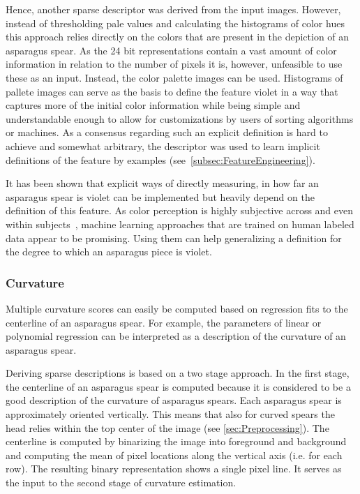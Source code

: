 Hence, another sparse descriptor was derived from the input images. However, instead of thresholding pale values and calculating the histograms of color hues this approach relies directly on the colors that are present in the depiction of an asparagus spear. As the 24 bit representations contain a vast amount of color information in relation to the number of pixels it is, however, unfeasible to use these as an input. Instead, the color palette images can be used. Histograms of pallete images can serve as the basis to define the feature violet in a way that captures more of the initial color information while being simple and understandable enough to allow for customizations by users of sorting algorithms or machines. As a consensus regarding such an explicit definition is hard to achieve and somewhat arbitrary, the descriptor was used to learn implicit definitions of the feature by examples (see~\autoref{subsec:FeatureEngineering}).

\bigskip
It has been shown that explicit ways of directly measuring, in how far an asparagus spear is violet can be implemented but heavily depend on the definition of this feature. As color perception is highly subjective across and even within subjects~\citep{reeves1981metacontrast}, machine learning approaches that are trained on human labeled data appear to be promising. Using them can help generalizing a definition for the degree to which an asparagus piece is violet.


\subsubsection{Curvature}
\label{subsec:Curvature}

Multiple curvature scores can easily be computed based on regression fits to the centerline of an asparagus spear. For example, the parameters of linear or polynomial regression can be interpreted as a description of the curvature of an asparagus spear. 

Deriving sparse descriptions is based on a two stage approach. In the first stage, the centerline of an asparagus spear is computed because it is considered to be a good description of the curvature of asparagus spears. Each asparagus spear is approximately oriented vertically. This means that also for curved spears the head relies within the top center of the image (see \autoref{sec:Preprocessing}). The centerline is computed by binarizing the image into foreground and background and computing the mean of pixel locations along the vertical axis (i.e. for each row). The resulting binary representation shows a single pixel line. It serves as the input to the second stage of curvature estimation.

